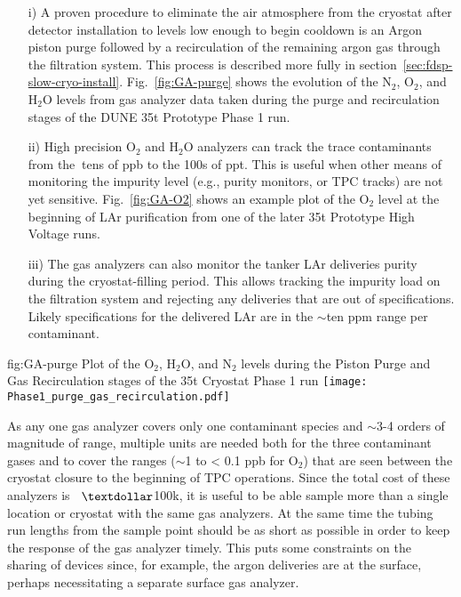 \begin{enumerate}
\item[i)] A proven procedure to eliminate the air atmosphere from the cryostat after detector installation to levels low enough to begin cooldown is an Argon piston purge followed by a recirculation of the remaining argon gas through the filtration system. This process is described more fully in section~\ref{sec:fdsp-slow-cryo-install}. Fig.~\ref{fig:GA-purge} shows the evolution of the $\text{N}_2$, $\text{O}_2$, and $\text{H}_2\text{O}$ levels from gas analyzer data taken during the purge and recirculation stages of the DUNE \num{35}\si{t} Prototype Phase 1 run.

\item[ii)] High precision $\text{O}_2$ and $\text{H}_2\text{O}$ analyzers can track the trace contaminants from the $\>$tens of ppb to the 100s of ppt. This is useful when other means of monitoring the impurity level (e.g., purity monitors, or TPC tracks) are not yet sensitive. Fig.~\ref{fig:GA-O2} shows an example plot of the $\text{O}_2$ level at the beginning of LAr purification from one of the later \num{35}\si{t} Prototype High Voltage runs.

\item[iii)] The gas analyzers can also monitor the tanker LAr deliveries purity during the cryostat-filling period. This allows tracking the impurity load on the filtration system and rejecting any deliveries that are out of specifications. Likely specifications for the delivered LAr are in the $\sim$ten ppm range per contaminant.

\end{enumerate}

\begin{dunefigure}{fig:GA-purge}
  {Plot of the $\text{O}_2$, $\text{H}_2\text{O}$, and $\text{N}_2$ levels during the Piston Purge and Gas Recirculation stages of the \num{35}\si{t} Cryostat Phase 1 run}
  \texttt{[image: Phase1\_purge\_gas\_recirculation.pdf]}%
\end{dunefigure}

As any one gas analyzer covers only one contaminant species and $\sim$3-4 orders of magnitude of range, multiple units are needed both for the three contaminant gases and to cover the ranges ($\sim$1 to < 0.1 ppb for $\text{O}_2$) that are seen between the cryostat closure to the beginning of TPC operations. Since the total cost of these analyzers is $\>$ $\textdollar$100k, it is useful to be able sample more than a single location or cryostat with the same gas analyzers. At the same time the tubing run lengths from the sample point should be as short as possible in order to keep the response of the gas analyzer timely. This puts some constraints on the sharing of devices since, for example, the argon deliveries are at the surface, perhaps necessitating a separate surface gas analyzer.

